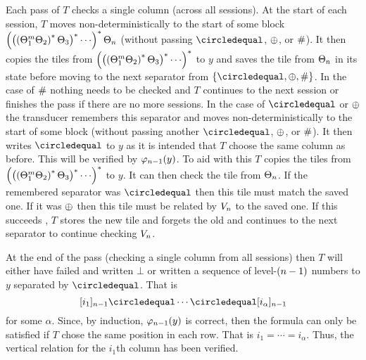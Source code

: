 \begin{itemize}
    Each pass of $T$ checks a single column (across all sessions).
    At the start of each session, $T$ moves non-deterministically to the start of some block
    $\brac{
        \brac{
            \brac{\tilesnum{1}^\linlen \tilesnum{2}}^\ast \tilesnum{3}
        }^\ast
        \cdots
    }^\ast
    \tilesnum{\expheight}$
    (without passing $\numeq$, $\oplus$, or $\#$).
    It then copies the tiles from
    $\brac{
        \brac{
            \brac{\tilesnum{1}^\linlen \tilesnum{2}}^\ast \tilesnum{3}
        }^\ast
        \cdots
    }^\ast$
    to $y$ and saves the tile from
    $\Theta_{n}$
    in its state before moving to the next separator from
    $\set{\numeq,\numplus,\numsep}$.
    In the case of $\#$ nothing needs to be checked and $T$ continues to the next session or finishes the pass if there are no more sessions.
    In the case of $\numeq$ or $\oplus$ the transducer remembers this separator and moves non-deterministically to the start of some block (without passing another $\numeq$, $\oplus$, or $\#$).
    It then writes $\numeq$ to $y$ as it is intended that $T$ choose the same column as before.
    This will be verified by
    ${\varphi_{n-1}}\mathord{\left( y \right)}$.
    To aid with this $T$ copies the tiles from
    $\brac{
        \brac{
            \brac{\tilesnum{1}^\linlen \tilesnum{2}}^\ast \tilesnum{3}
        }^\ast
        \cdots
    }^\ast$
    to $y$.
    It can then check the tile from
    $\Theta_{n}$.
    If the remembered separator was $\numeq$ then this tile must match the saved one.
    If it was $\oplus$ then this tile must be related by
    $V_{n}$
    to the saved one.
    If this succeeds , $T$ stores the new tile and forgets the old and continues to the next separator to continue checking
    $V_{n}$.

    At the end of the pass (checking a single column from all sessions) then $T$ will either have failed and written $\bot$ or written a sequence of level-$(n-1)$ numbers to $y$ separated by $\numeq$.
    That is
    \[
        \tenc{\expheight-1}{i_1}
        \numeq
        \cdots
        \numeq
        \tenc{\expheight-1}{i_{\alpha}}
    \]
    for some $\alpha$.
    Since, by induction,
    ${\varphi_{n-1}}\mathord{\left( y \right)}$
    is correct, then the formula can only be satisfied if $T$ chose the same position in each row.
    That is
    $i_1 = \cdots = i_\alpha$.
    Thus, the vertical relation for the $i_1$th column has been verified.


\end{itemize}

